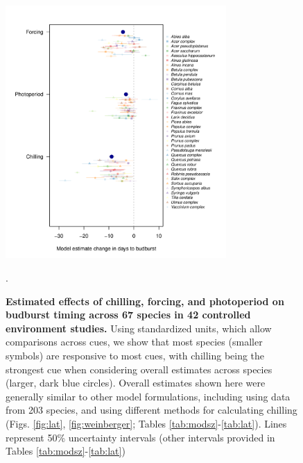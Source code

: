 \documentclass{article}
\begin{document}
\begin{figure}[h!]
\centering
\noindent \includegraphics[width=0.75\textwidth]{..//..//analyses/bb_analysis/figures/muplotspcompexprampfputah_z.pdf}
\caption{\textbf{Estimated effects of chilling, forcing, and photoperiod on budburst timing across 67 species in 42 controlled environment studies.} Using standardized units, which allow comparisons across cues, we show that most species (smaller symbols) are responsive to most cues, with chilling being the strongest cue when considering overall estimates across species (larger, dark blue circles). Overall estimates shown here were generally similar to other model formulations, including using data from 203 species, and using different methods for calculating chilling (Figs. \ref{fig:lat}, \ref{fig:weinberger}; Tables \ref{tab:modsz}-\ref{tab:lat}). Lines represent 50\% uncertainty intervals (other intervals provided in Tables \ref{tab:modsz}-\ref{tab:lat})}. %
\label{fig:mu}
\end{figure}

\newpage
\end{document}
